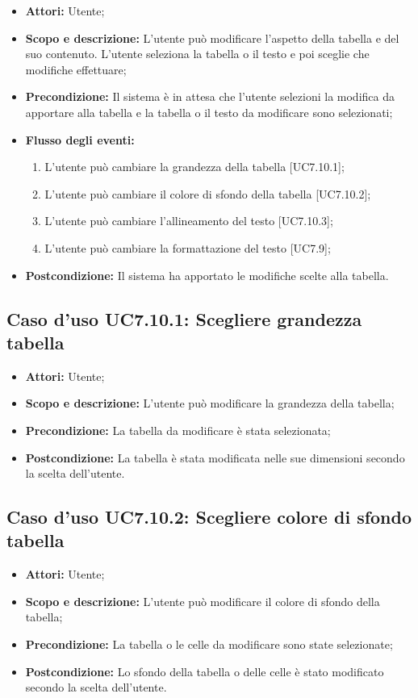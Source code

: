 \begin{itemize}
	\item \textbf{Attori:} Utente;
	\item \textbf{Scopo e descrizione:} L'utente può modificare l'aspetto della tabella e del suo contenuto. L'utente seleziona la tabella o il testo e poi sceglie che modifiche effettuare;
	\item \textbf{Precondizione:} Il sistema è in attesa che l'utente selezioni la modifica da apportare alla tabella e la tabella o il testo da modificare sono selezionati;
	\item \textbf{Flusso degli eventi:}
	\begin{enumerate}
		\item L'utente può cambiare la grandezza della tabella [UC7.10.1];
		\item L'utente può cambiare il colore di sfondo della tabella [UC7.10.2];
		\item L'utente può cambiare l'allineamento del testo [UC7.10.3];
		\item L'utente può cambiare la formattazione del testo [UC7.9];
	\end{enumerate}
	\item \textbf{Postcondizione:} Il sistema ha apportato le modifiche scelte alla tabella.
\end{itemize}

\subsection{Caso d'uso UC7.10.1: Scegliere grandezza tabella}
\begin{itemize}
	\item \textbf{Attori:} Utente;
	\item \textbf{Scopo e descrizione:} L'utente può modificare la grandezza della tabella;
	\item \textbf{Precondizione:} La tabella da modificare è stata selezionata;
	\item \textbf{Postcondizione:} La tabella è stata modificata nelle sue dimensioni secondo la scelta dell'utente.
\end{itemize}

\subsection{Caso d'uso UC7.10.2: Scegliere colore di sfondo tabella}
\begin{itemize}
	\item \textbf{Attori:} Utente;
	\item \textbf{Scopo e descrizione:} L'utente può modificare il colore di sfondo della tabella;
	\item \textbf{Precondizione:} La tabella o le celle da modificare sono state selezionate;
	\item \textbf{Postcondizione:} Lo sfondo della tabella o delle celle è stato modificato secondo la scelta dell'utente.
\end{itemize}

